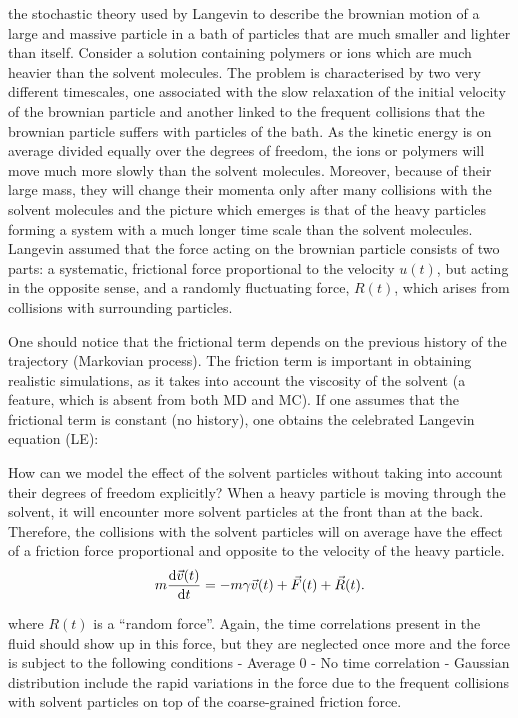 \documentclass[../../main-notes.tex]{subfiles}
\begin{document}
{the stochastic theory used by Langevin to describe the brownian motion of a large and massive particle in a bath of particles that are much smaller and lighter than itself.\citep{tsl2006}
Consider a solution containing polymers or ions which are much heavier than the solvent molecules\citep{Thijssen2007}. 
The problem is characterised by two very different timescales, one associated with the slow relaxation of the initial velocity of the brownian particle and another linked to the frequent collisions that the brownian particle suffers with particles of the bath\citep{tsl2006}. 
As the kinetic energy is on average divided equally over the degrees of freedom, the ions or polymers will move much more slowly than the solvent molecules\citep{Thijssen2007}.
Moreover, because of their large mass, they will change their momenta only after many collisions with the solvent molecules and the picture which emerges is that of the heavy particles forming a system with a much longer time scale than the solvent molecules\citep{Thijssen2007}.
Langevin assumed that the force acting on the brownian particle consists of two parts: a systematic, frictional force proportional to the velocity $u(t)$, but acting in the opposite sense, and a randomly fluctuating force, $R(t)$, which arises from collisions with surrounding particles\citep{tsl2006}.

One should notice that the frictional term depends on the previous history of the trajectory (Markovian process). 
The friction term is important in obtaining realistic simulations, as it takes into account the viscosity of the solvent (a feature, which is absent from both MD and MC). 
If one assumes that the frictional term is constant (no history), one obtains the celebrated Langevin equation (LE):\citep{paquetMolecularDynamicsMonte2015}



How can we model the effect of the solvent particles without taking into account their degrees of freedom explicitly? 
When a heavy particle is moving through the solvent, it will encounter more solvent particles at the front than at the back. 
Therefore, the collisions with the solvent particles will on average have the effect of a friction force proportional and opposite to the velocity of the heavy particle.\citep{Thijssen2007}
\begin{gather}
    m\dv{\vec{v}(t)}{t}=-m\gamma \vec{v}(t)+\vec{F}(t)+\vec{R}(t).\label{eqn:BrownianDyn1}
\end{gather}

where $R(t)$ is a ``random force''.
Again, the time correlations present in the fluid should show up in this force, but they are neglected once more and the force is subject to the following conditions 
- Average $0$
- No time correlation
- Gaussian distribution
include the rapid variations in the force due to the frequent collisions with solvent particles on top of the coarse-grained friction force.

}
\end{document}
